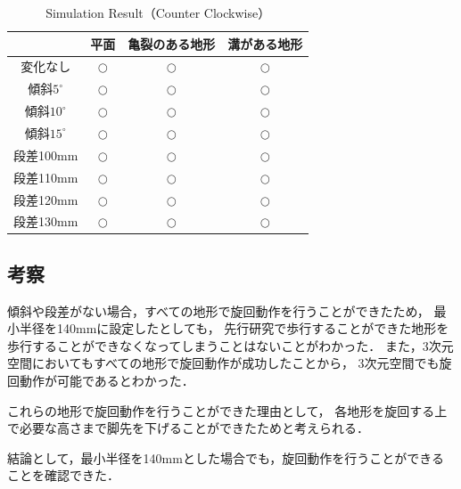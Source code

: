 \begin{table}[htbp]
  \centering
  \caption{Simulation Result（Counter Clockwise）}
  \label{tab:ch5_simu_result_turn}  %
  \begin{tabular}{|c|c|c|c|} \hline  %
    & 平面 & 亀裂のある地形 & 溝がある地形 \\ \hline  %
    変化なし & $\bigcirc$ & $\bigcirc$ & $\bigcirc$ \\ \hline  %
    傾斜$5^{\circ}$ & $\bigcirc$ & $\bigcirc$ & $\bigcirc$ \\ \hline  %
    傾斜$10^{\circ}$ & $\bigcirc$ & $\bigcirc$ & $\bigcirc$ \\ \hline  %
    傾斜$15^{\circ}$ & $\bigcirc$ & $\bigcirc$ & $\bigcirc$ \\ \hline  %
    段差100mm & $\bigcirc$ & $\bigcirc$ & $\bigcirc$ \\ \hline  %
    段差110mm & $\bigcirc$ & $\bigcirc$ & $\bigcirc$ \\ \hline  %
    段差120mm & $\bigcirc$ & $\bigcirc$ & $\bigcirc$ \\ \hline  %
    段差130mm & $\bigcirc$ & $\bigcirc$ & $\bigcirc$ \\ \hline  %
  \end{tabular}
\end{table}



\subsection{考察}
傾斜や段差がない場合，すべての地形で旋回動作を行うことができたため，
最小半径を140mmに設定したとしても，
先行研究で歩行することができた地形を歩行することができなくなってしまうことはないことがわかった．
また，3次元空間においてもすべての地形で旋回動作が成功したことから，
3次元空間でも旋回動作が可能であるとわかった．

これらの地形で旋回動作を行うことができた理由として，
各地形を旋回する上で必要な高さまで脚先を下げることができたためと考えられる．


結論として，最小半径を140mmとした場合でも，旋回動作を行うことができることを確認できた．